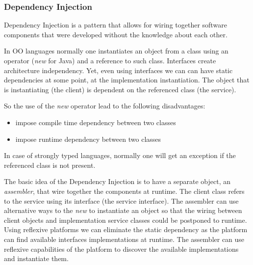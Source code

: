 \subsubsection{Dependency Injection}

Dependency Injection is a pattern that allows for wiring together software components that were developed without the knowledge about each other.~\cite{fowler_inversion_2004}

In OO languages normally one instantiates an object from a class using an operator (\emph{new} for Java) and a reference to such class.
Interfaces create architecture independency. Yet, even using interfaces we can can have static dependencies at some point, at the implementation instantiation.
The object that is instantiating (the client) is dependent on the referenced class (the service).

So the use of the \emph{new} operator lead to the following disadvantages:
\begin{itemize}
  \item impose compile time dependency between two classes
  \item impose runtime dependency between two classes
\end{itemize}

In case of strongly typed languages, normally one will get an exception if the referenced class is not present.

The basic idea of the Dependency Injection is to have a separate object, an \emph{assembler}, that wire together the components at runtime\cite{fowler_inversion_2004}. The client class refers to the service using its interface (the service interface). The assembler can use alternative ways to the \emph{new} to instantiate an object so that the wiring between client objects and implementation service classes could be postponed to runtime. Using reflexive platforms we can eliminate the static dependency as the platform can find available interfaces implementations at runtime.
The assembler can use reflexive capabilities of the platform to discover the available implementations and instantiate them.


